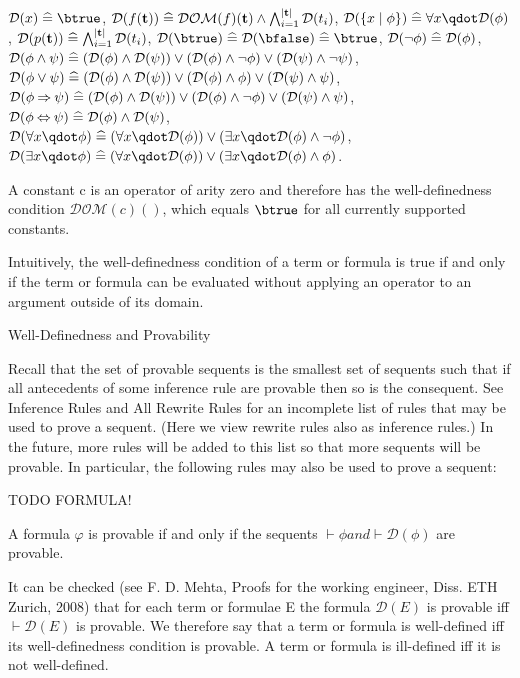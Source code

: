     $\mathcal{D}(x)\defi \btrue$,
    $\mathcal{D}(f(\mathbf{t}))\mathrel{\widehat=} \mathcal{DOM}(f)(\mathbf{t}) \land \bigwedge_{i=1}^{|\mathbf{t}|} \mathcal{D}(t_i)$,
    $\mathcal{D}(\{x\mid \phi\})\defi \forall x\qdot \mathcal{D}(\phi)$,
    $\mathcal{D}(p(\mathbf{t}))\mathrel{\widehat=} \bigwedge_{i=1}^{|\mathbf{t}|} \mathcal{D}(t_i)$,
    $\mathcal{D}(\btrue) \defi \mathcal{D}(\bfalse) \defi \btrue$,
    $\mathcal{D}(\lnot\phi) \mathrel{\widehat=} \mathcal{D}(\phi)$,
    $\mathcal{D}(\phi\land\psi)\mathrel{\widehat=} (\mathcal{D}(\phi) \land \mathcal{D}(\psi)) \lor (\mathcal{D}(\phi) \land \lnot\phi) \lor (\mathcal{D}(\psi) \land \lnot\psi)$,
    $\mathcal{D}(\phi\lor\psi)\mathrel{\widehat=} (\mathcal{D}(\phi) \land \mathcal{D}(\psi)) \lor (\mathcal{D}(\phi) \land \phi) \lor (\mathcal{D}(\psi) \land \psi)$,
    $\mathcal{D}(\phi\mathbin\Rightarrow\psi)\mathrel{\widehat=} (\mathcal{D}(\phi) \land \mathcal{D}(\psi)) \lor (\mathcal{D}(\phi) \land \lnot\phi) \lor (\mathcal{D}(\psi) \land \psi)$,
    $\mathcal{D}(\phi\mathbin\Leftrightarrow\psi)\mathrel{\widehat=} \mathcal{D}(\phi) \land \mathcal{D}(\psi)$,
    $\mathcal{D}(\forall x\qdot \phi)\defi (\forall x \qdot \mathcal{D}(\phi)) \lor (\exists x \qdot \mathcal{D}(\phi) \land \lnot \phi)$,
    $\mathcal{D}(\exists x\qdot \phi)\defi (\forall x \qdot \mathcal{D}(\phi)) \lor (\exists x \qdot \mathcal{D}(\phi) \land \phi)$. 

A constant c is an operator of arity zero and therefore has the well-definedness condition $\mathcal{DOM}(c)()$, which equals $\btrue$ for all currently supported constants.

Intuitively, the well-definedness condition of a term or formula is true if and only if the term or formula can be evaluated without applying an operator to an argument outside of its domain.

Well-Definedness and Provability

Recall that the set of provable sequents is the smallest set of sequents such that if all antecedents of some inference rule are provable then so is the consequent. See Inference Rules and All Rewrite Rules for an incomplete list of rules that may be used to prove a sequent. (Here we view rewrite rules also as inference rules.) In the future, more rules will be added to this list so that more sequents will be provable. In particular, the following rules may also be used to prove a sequent:

TODO FORMULA!

A formula $φ$ is provable if and only if the sequents $\vdash\phi and \vdash\mathcal{D}(\phi)$ are provable.

It can be checked (see F. D. Mehta, Proofs for the working engineer, Diss. ETH Zurich, 2008) that for each term or formulae E the formula $\mathcal{D}(E)$ is provable iff $\vdash\mathcal{D}(E)$ is provable. We therefore say that a term or formula is well-defined iff its well-definedness condition is provable. A term or formula is ill-defined iff it is not well-defined.


